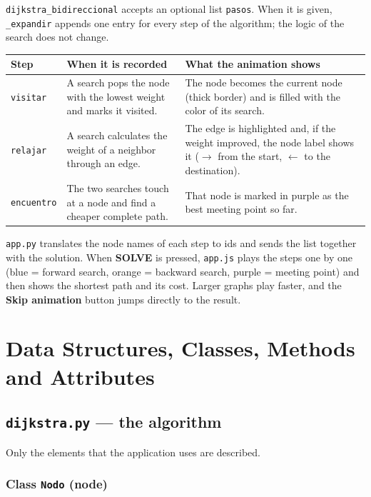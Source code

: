 \documentclass[11pt,letterpaper]{article}
\newcommand{\code}[1]{\texttt{#1}}
\begin{document}
\code{dijkstra\_bidireccional} accepts an optional list \code{pasos}. When it
is given, \code{\_expandir} appends one entry for every step of the algorithm;
the logic of the search does not change.

\begin{center}
\begin{tabularx}{\textwidth}{>{\raggedright\arraybackslash}p{2cm}LL}
\toprule
\textbf{Step} & \textbf{When it is recorded} & \textbf{What the animation shows} \\
\midrule
\code{visitar}   & A search pops the node with the lowest weight and marks it visited. & The node becomes the current node (thick border) and is filled with the color of its search. \\
\code{relajar}   & A search calculates the weight of a neighbor through an edge. & The edge is highlighted and, if the weight improved, the node label shows it ($\rightarrow$ from the start, $\leftarrow$ to the destination). \\
\code{encuentro} & The two searches touch at a node and find a cheaper complete path. & That node is marked in purple as the best meeting point so far. \\
\bottomrule
\end{tabularx}
\end{center}

\code{app.py} translates the node names of each step to ids and sends the
list together with the solution. When \textbf{SOLVE} is pressed,
\code{app.js} plays the steps one by one (blue = forward search, orange =
backward search, purple = meeting point) and then shows the shortest path and
its cost. Larger graphs play faster, and the \textbf{Skip animation} button
jumps directly to the result.

\section{Data Structures, Classes, Methods and Attributes}

\subsection{\code{dijkstra.py} --- the algorithm}

Only the elements that the application uses are described.

\subsubsection*{Class \code{Nodo} (node)}
\end{document}
